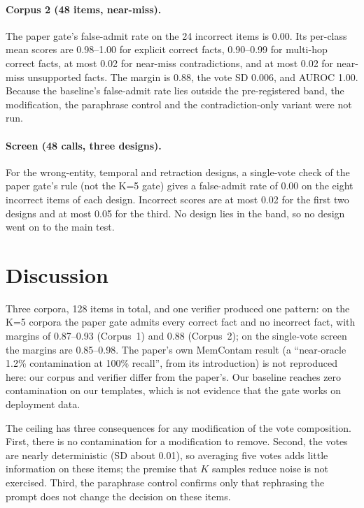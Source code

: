 \documentclass[11pt]{article}
\begin{document}
\paragraph{Corpus 2 (48 items, near-miss).} The paper gate's false-admit rate on the 24 incorrect items is 0.00. Its per-class mean scores are 0.98--1.00 for explicit correct facts, 0.90--0.99 for multi-hop correct facts, at most 0.02 for near-miss contradictions, and at most 0.02 for near-miss unsupported facts. The margin is 0.88, the vote SD 0.006, and AUROC 1.00. Because the baseline's false-admit rate lies outside the pre-registered band, the modification, the paraphrase control and the contradiction-only variant were not run.

\paragraph{Screen (48 calls, three designs).} For the wrong-entity, temporal and retraction designs, a single-vote check of the paper gate's rule (not the K=5 gate) gives a false-admit rate of 0.00 on the eight incorrect items of each design. Incorrect scores are at most 0.02 for the first two designs and at most 0.05 for the third. No design lies in the band, so no design went on to the main test.

\section{Discussion}
Three corpora, 128 items in total, and one verifier produced one pattern: on the K=5 corpora the paper gate admits every correct fact and no incorrect fact, with margins of 0.87--0.93 (Corpus~1) and 0.88 (Corpus~2); on the single-vote screen the margins are 0.85--0.98. The paper's own MemContam result (a ``near-oracle 1.2\% contamination at 100\% recall'', from its introduction) is not reproduced here: our corpus and verifier differ from the paper's. Our baseline reaches zero contamination on our templates, which is not evidence that the gate works on deployment data.

The ceiling has three consequences for any modification of the vote composition. First, there is no contamination for a modification to remove. Second, the votes are nearly deterministic (SD about 0.01), so averaging five votes adds little information on these items; the premise that $K$ samples reduce noise is not exercised. Third, the paraphrase control confirms only that rephrasing the prompt does not change the decision on these items.
\end{document}

